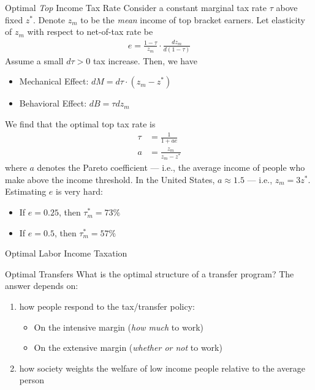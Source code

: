 \documentclass[10pt]{extarticle}
\begin{document}
  \begin{problem}{Optimal \textit{Top} Income Tax Rate}
    Consider a constant marginal tax rate $\tau$ above fixed $z^{\ast}$. Denote $z_m$ to be the \textit{mean} income of top bracket earners. Let elasticity of $z_m$ with respect to net-of-tax rate be
    \begin{align*}
      e = \frac{1-\tau}{z_m}\cdot \frac{dz_m}{d(1-\tau)}
    \end{align*}
    Assume a small $d\tau > 0$ tax increase. Then, we have
    \begin{itemize}
      \item Mechanical Effect: $dM = d\tau \cdot (z_m - z^{\ast})$
      \item Behavioral Effect: $dB = \tau dz_m$
    \end{itemize}
    We find that the optimal top tax rate is
    \begin{align*}
      \tau &= \frac{1}{1+ae}\\
      a &= \frac{z_m}{z_m-z^{\ast}}
    \end{align*}
    where $a$ denotes the Pareto coefficient --- i.e., the average income of people who make above the income threshold. In the United States, $a \approx 1.5$ --- i.e., $z_m = 3z^{\ast}$.\\

    Estimating $e$ is very hard:
    \begin{itemize}
      \item If $e = 0.25$, then $\tau^{\ast}_m = 73\%$
      \item If $e = 0.5$, then $\tau^{\ast}_m = 57\%$
    \end{itemize}
  \end{problem}
  \begin{problem}{Optimal Labor Income Taxation}
    \begin{tcbraster}[raster columns = 2, sharp corners, colframe = black!75!white,colback=white]
    \end{tcbraster}
  \end{problem}
  \begin{problem}{Optimal Transfers}
    What is the optimal structure of a transfer program? The answer depends on:
    \begin{enumerate}[(1)]
      \item how people respond to the tax/transfer policy:
        \begin{itemize}
          \item On the intensive margin (\textit{how much} to work)
          \item On the extensive margin (\textit{whether or not} to work)
        \end{itemize}
      \item how society weights the welfare of low income people relative to the average person
    \end{enumerate}
  \end{problem}
\end{document}
